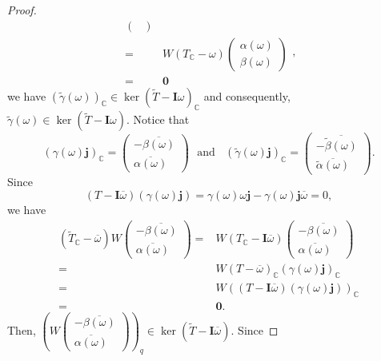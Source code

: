 \documentclass[10pt,a4paper]{amsart}
\begin{document}
\begin{proof}
$$\begin{aligned}
\begin{pmatrix}
    \end{pmatrix}\\
    = & W(T_{{\mathbb{C}}}-\omega)
    \begin{pmatrix}
    \alpha(\omega) \\
    \beta(\omega)
    \end{pmatrix}\\
    =&\boldsymbol{0}
    \end{aligned},$$
    we have
    $(\widetilde{\gamma}(\omega))_{\mathbb{C}}\in\ker{(\widetilde{T}-\boldsymbol{I}\omega)_{\mathbb{C}}}$ and consequently, $\widetilde{\gamma}(\omega)\in\ker{(\widetilde{T}-\boldsymbol{I}\omega)}$.
Notice that
\[
(\gamma(\omega)\boldsymbol{j})_{\mathbb{C}}=\begin{pmatrix}
	-\overline{\beta(\omega)} \\
	\overline{\alpha(\omega)}
\end{pmatrix} \ \ \ \text{and} \ \ \ \ (\widetilde{\gamma}(\omega)\boldsymbol{j})_{\mathbb{C}}=\begin{pmatrix}
-\overline{\widetilde{\beta}(\omega)} \\
\overline{\widetilde{\alpha}(\omega)}
\end{pmatrix}.
\]
Since
\[
({T}-\boldsymbol{I}\overline{\omega})(\gamma(\omega)\boldsymbol{j})=\gamma(\omega)\omega\boldsymbol{j}-\gamma(\omega)\boldsymbol{j}\overline{\omega}=0,
\]
we have
    $$
    \begin{aligned}
  (\widetilde{T}_{{\mathbb{C}}}-\overline{\omega})W\begin{pmatrix}
-\overline{\beta(\omega)} \\
\overline{\alpha(\omega)}
\end{pmatrix}
	= & W({T}_{\mathbb{C}}-\boldsymbol{I}\overline{\omega})\begin{pmatrix}
		-\overline{\beta(\omega)} \\
		\overline{\alpha(\omega)}
	\end{pmatrix} \\
	= & W({T}-\overline{\omega})_{\mathbb{C}}(\gamma(\omega)\boldsymbol{j})_{\mathbb{C}} \\
	= & W(({T}-\boldsymbol{I}\overline{\omega})(\gamma(\omega)\boldsymbol{j}))_{\mathbb{C}} \\
	= & \boldsymbol{0}.
\end{aligned}
$$
Then, $\left( W\begin{pmatrix}
	-\overline{\beta(\omega)} \\
	\overline{\alpha(\omega)}
\end{pmatrix} \right)_q\in\ker(\widetilde{T}-\boldsymbol{I}\overline{\omega})$. Since

\end{proof}
\end{document}
